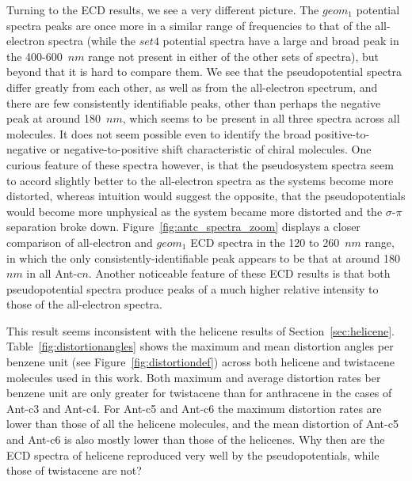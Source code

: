 \documentclass[aip,reprint,nofootinbib]{revtex4-1}
\begin{document}
Turning to the ECD results, we see a very different picture. The $geom_1$ potential spectra peaks are once more in a similar range of frequencies to that of the all-electron spectra (while the $set4$ potential spectra have a large and broad peak in the 400-600~$nm$ range not present in either of the other sets of spectra), but beyond that it is hard to compare them. We see that the pseudopotential spectra differ greatly from each other, as well as from the all-electron spectrum, and there are few consistently identifiable peaks, other than perhaps the negative peak at around 180~$nm$, which seems to be present in all three spectra across all molecules. It does not seem possible even to identify the broad positive-to-negative or negative-to-positive shift characteristic of chiral molecules. One curious feature of these spectra however, is that the pseudosystem spectra seem to accord slightly better to the all-electron spectra as the systems become more distorted, whereas intuition would suggest the opposite, that the pseudopotentials would become more unphysical as the system became more distorted and the $\sigma$-$\pi$ separation broke down. Figure~\ref{fig:antc_spectra_zoom} displays a closer comparison of all-electron and $geom_1$ ECD spectra in the 120 to 260~$nm$ range, in which the only consistently-identifiable peak appears to be that at around 180~$nm$ in all Ant-c$n$. Another noticeable feature of these ECD results is that both pseudopotential spectra produce peaks of a much higher relative intensity to those of the all-electron spectra.

This result seems inconsistent with the helicene results of Section~\ref{sec:helicene}. Table~\ref{fig:distortionangles} shows the maximum and mean distortion angles per benzene unit (see Figure~\ref{fig:distortiondef}) across both helicene and twistacene molecules used in this work. Both maximum and average distortion rates ber benzene unit are only greater for twistacene than for anthracene in the cases of Ant-c3 and Ant-c4. For Ant-c5 and Ant-c6 the maximum distortion rates are lower than those of all the helicene molecules, and the mean distortion of Ant-c5 and Ant-c6 is also mostly lower than those of the helicenes. Why then are the ECD spectra of helicene reproduced very well by the pseudopotentials, while those of twistacene are not? 
\end{document}
